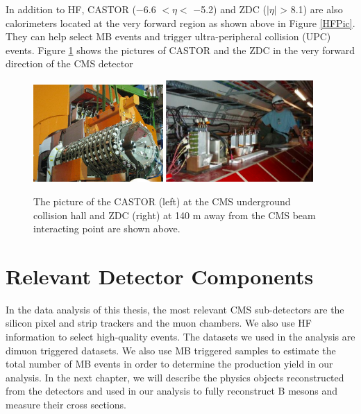 In addition to HF, CASTOR ($-$6.6 $< \eta <$ $-$5.2) and ZDC ($|\eta|$ > 8.1) are also calorimeters located at the very forward region \cite{CASZDCRef} as shown above in Figure \ref{HFPic}. They can help select MB events and trigger ultra-peripheral collision (UPC) events. Figure \ref{CASTORZDC} shows the pictures of CASTOR and the ZDC in the very forward direction of the CMS detector

\begin{figure}[hbtp]
\begin{center}
\includegraphics[width=0.44\textwidth]{Figures/Chapter3/CASTOR.png}
\includegraphics[width=0.50\textwidth]{Figures/Chapter3/CMSZDC.png}
\caption{The picture of the CASTOR (left) at the CMS underground collision hall and ZDC (right) at 140 m away from the CMS beam interacting point are shown above.}
\label{CASTORZDC}
\end{center}
\end{figure} 


\section{Relevant Detector Components}

In the data analysis of this thesis, the most relevant CMS sub-detectors are the silicon pixel and strip trackers and the muon chambers. We also use HF information to select high-quality events. The datasets we used in the analysis are dimuon triggered datasets. We also use MB triggered samples to estimate the total number of MB events in order to determine the production yield in our analysis. In the next chapter, we will describe the physics objects reconstructed from the detectors and used in our analysis to fully reconstruct B mesons and measure their cross sections.





